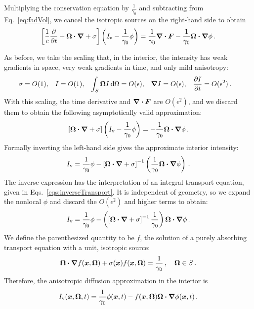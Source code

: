 Multiplying the conservation equation by $\frac{1}{\gamma_0}$ and subtracting
from Eq.~\eqref{eq:fadVol}, we cancel the isotropic sources on the right-hand
side to obtain
\begin{equation*}
  \left[ \frac{1}{c}\frac{\partial }{\partial t}
  + \bm{\Omega}\bm{\cdot} \bm{\nabla}
  + \sigma \right]
   \left( I_\mathrm{v}
  - \frac{1}{\gamma_0} \phi \right)
  = \frac{1}{\gamma_0} \bm{\nabla} \bm{\cdot}\bm{F} -
  \frac{1}{\gamma_0} \bm{\Omega}\bm{\cdot} \bm{\nabla} \phi\,.
\end{equation*}

As before, we take the scaling that, in the interior, the intensity has weak
gradients in space, very weak gradients in time, and only mild anisotropy:
\begin{align} \label{eq:ansatz_6}
  \sigma &= O(1), &
  I &= O(1), &
  \int_{S} \bm{\Omega} I \mathop{}\!\mathrm{d}\Omega &= O(\epsilon), &
  \bm{\nabla} I &= O(\epsilon), &
  \frac{\partial I}{\partial t} &= O(\epsilon^2) \,.
\end{align}
With this scaling, the time derivative and $\bm{\nabla} \bm{\cdot}\bm{F}$ are
$O(\epsilon^2)$, and we discard them to obtain the following asymptotically
valid approximation:
\begin{equation*}
  \left[ \bm{\Omega}\bm{\cdot} \bm{\nabla} + \sigma \right]
  \left( I_\mathrm{v} - \frac{1}{\gamma_0} \phi \right)
  =  -\frac{1}{\gamma_0} \bm{\Omega}\bm{\cdot} \bm{\nabla} \phi\,.
\end{equation*}
Formally inverting the left-hand side gives the approximate interior
intensity:
\begin{equation*}
  I_\mathrm{v} = \frac{1}{\gamma_0} \phi 
  - \left[ \bm{\Omega}\bm{\cdot} \bm{\nabla} + \sigma \right]^{-1} \left( \frac{1}{\gamma_0}
  \bm{\Omega}\bm{\cdot} \bm{\nabla} \phi \right)\,.
\end{equation*}
The inverse expression has the interpretation of an integral transport equation,
given in Eqs.~\eqref{eqs:inverseTransport}. It is independent of geometry, so we
expand the nonlocal $\phi$ and discard the $O(\epsilon^2)$ and higher terms to
obtain:
\begin{equation*}
  I_\mathrm{v} = \frac{1}{\gamma_0} \phi 
  - \left( \left[ \bm{\Omega}\bm{\cdot} \bm{\nabla} + \sigma \right]^{-1} \frac{1}{\gamma_0}
  \right) \bm{\Omega}\bm{\cdot} \bm{\nabla} \phi \,.
\end{equation*}
We define the parenthesized quantity to be $f$, the solution of a purely
absorbing transport equation with a unit, isotropic source:
\begin{equation} \label{eq:fadFVol}
  \bm{\Omega}\bm{\cdot} \bm{\nabla} f(\bm{x}, \bm{\Omega})
  + \sigma(\bm{x}) f (\bm{x}, \bm{\Omega})
= \frac{1}{\gamma_0} \,, \quad \bm{\Omega} \in S\,.
\end{equation}
Therefore, the anisotropic diffusion approximation in the interior is
\begin{equation}\label{eq:fadVolApproxFinal}
  I_\mathrm{v}(\bm{x},\bm{\Omega},t)
  = \frac{1}{\gamma_0} \phi(\bm{x},t)
  - f(\bm{x}, \bm{\Omega}) \bm{\Omega}\bm{\cdot} \bm{\nabla} \phi(\bm{x},t) \,.
\end{equation}

